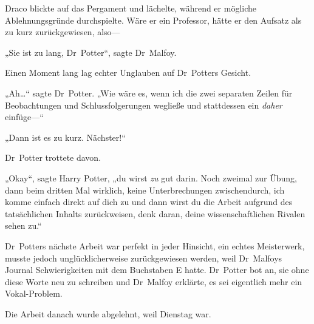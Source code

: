 Draco blickte auf das Pergament und lächelte, während er mögliche Ablehnungsgründe durchspielte. Wäre er ein Professor, hätte er den Aufsatz als zu kurz zurückgewiesen, also—

„Sie ist zu lang, Dr~Potter“, sagte Dr~Malfoy.

Einen Moment lang lag echter Unglauben auf Dr~Potters Gesicht.

„Ah…“ sagte Dr~Potter. „Wie wäre es, wenn ich die zwei separaten Zeilen für Beobachtungen und Schlussfolgerungen wegließe und stattdessen ein \emph{daher} einfüge—“

„Dann ist es zu kurz. Nächster!“

Dr~Potter trottete davon.

„Okay“, sagte Harry Potter, „du wirst \emph{zu} gut darin. Noch zweimal zur Übung, dann beim dritten Mal wirklich, keine Unterbrechungen zwischendurch, ich komme einfach direkt auf dich zu und dann wirst du die Arbeit aufgrund des tatsächlichen Inhalts zurückweisen, denk daran, deine wissenschaftlichen Rivalen sehen zu.“

Dr~Potters nächste Arbeit war perfekt in jeder Hinsicht, ein echtes Meisterwerk, musste jedoch unglücklicherweise zurückgewiesen werden, weil Dr~Malfoys Journal Schwierigkeiten mit dem Buchstaben E hatte. Dr~Potter bot an, sie ohne diese Worte neu zu schreiben und Dr~Malfoy erklärte, es sei eigentlich mehr ein Vokal-Problem.

Die Arbeit danach wurde abgelehnt, weil Dienstag war.

